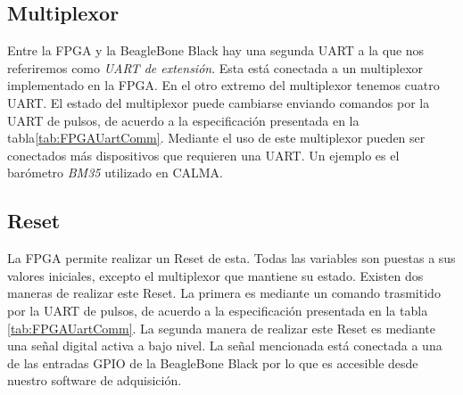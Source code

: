 	\subsection{Multiplexor}
		Entre la FPGA y la BeagleBone Black hay una segunda UART a la que nos referiremos como \emph{UART de extensión}. Esta está conectada a
		un multiplexor implementado en la FPGA. En el otro extremo del multiplexor tenemos cuatro UART. El estado del multiplexor puede
		cambiarse enviando comandos por la UART de pulsos, de acuerdo a la especificación presentada en la tabla\ref{tab:FPGAUartComm}.
		Mediante el uso de este multiplexor pueden ser conectados más dispositivos que requieren una UART. Un ejemplo es el barómetro
		\emph{BM35} utilizado en CALMA. 
	\subsection{Reset}
		La FPGA permite realizar un Reset de esta. Todas las variables son puestas a sus valores iniciales, excepto el multiplexor que
		mantiene su estado. Existen dos maneras de realizar este Reset. La primera es mediante un comando trasmitido por la UART de pulsos, de
		acuerdo a la especificación presentada en la tabla \ref{tab:FPGAUartComm}. La segunda manera de realizar este Reset es mediante una
		señal digital activa a bajo nivel. La señal mencionada está conectada a una de las entradas GPIO de la BeagleBone Black por lo que es
		accesible desde nuestro software de adquisición.
